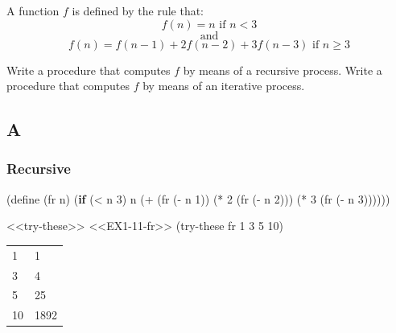 \documentclass[
]{article}
\newenvironment{Shaded}{}{}
\newcommand{\DecValTok}[1]{\textcolor[rgb]{0.25,0.63,0.44}{#1}}
\newcommand{\ExtensionTok}[1]{#1}
\newcommand{\FunctionTok}[1]{\textcolor[rgb]{0.02,0.16,0.49}{#1}}
\newcommand{\KeywordTok}[1]{\textcolor[rgb]{0.00,0.44,0.13}{\textbf{#1}}}
\newcommand{\NormalTok}[1]{#1}
\newcommand{\OperatorTok}[1]{\textcolor[rgb]{0.40,0.40,0.40}{#1}}
\begin{document}
A function \(f\) is defined by the rule that: \[
f(n)=n \text{ if } n<3
\] \[
\text{ and }
\] \[
f(n)=f(n-1)+2f(n-2)+3f(n-3) \text{ if } n \geq 3
\]

Write a procedure that computes \(f\) by means of a recursive process.
Write a procedure that computes \(f\) by means of an iterative process.

\hypertarget{a-9}{%
\subsection{A}\label{a-9}}

\hypertarget{recursive}{%
\subsubsection{Recursive}\label{recursive}}

\hypertarget{EX1-11-fr}{%
\label{EX1-11-fr}}%
\begin{Shaded}
\begin{Highlighting}[numbers=left,,]
\NormalTok{(}\ExtensionTok{define}\FunctionTok{ }\NormalTok{(fr n)}
\NormalTok{  (}\KeywordTok{if}\NormalTok{ (}\OperatorTok{\textless{}}\NormalTok{ n }\DecValTok{3}\NormalTok{)}
\NormalTok{      n}
\NormalTok{      (}\OperatorTok{+}\NormalTok{      (fr (}\OperatorTok{{-}}\NormalTok{ n }\DecValTok{1}\NormalTok{))}
\NormalTok{         (}\OperatorTok{*} \DecValTok{2}\NormalTok{ (fr (}\OperatorTok{{-}}\NormalTok{ n }\DecValTok{2}\NormalTok{)))}
\NormalTok{         (}\OperatorTok{*} \DecValTok{3}\NormalTok{ (fr (}\OperatorTok{{-}}\NormalTok{ n }\DecValTok{3}\NormalTok{))))))}
\end{Highlighting}
\end{Shaded}

\begin{Shaded}
\begin{Highlighting}[numbers=left,,]
\NormalTok{\textless{}\textless{}try{-}these\textgreater{}\textgreater{}}
\NormalTok{\textless{}\textless{}EX1{-}11{-}fr\textgreater{}\textgreater{}}
\NormalTok{(try{-}these fr }\DecValTok{1} \DecValTok{3} \DecValTok{5} \DecValTok{10}\NormalTok{)}
\end{Highlighting}
\end{Shaded}

\begin{longtable}[]{@{}ll@{}}
\toprule
\endhead
1 & 1 \\
3 & 4 \\
5 & 25 \\
10 & 1892 \\
\bottomrule
\end{longtable}
\end{document}
